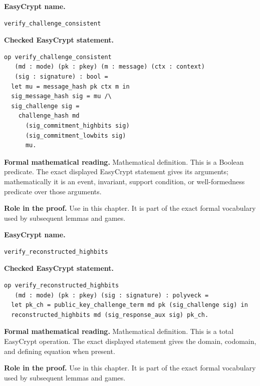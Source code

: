 \begin{formaldefinition}
\noindent\textbf{EasyCrypt name.}
\begin{lstlisting}[language=EasyCrypt,basicstyle=\ttfamily\scriptsize]
verify_challenge_consistent
\end{lstlisting}
\noindent\textbf{Checked EasyCrypt statement.}
\begin{lstlisting}[language=EasyCrypt,basicstyle=\ttfamily\scriptsize]
op verify_challenge_consistent
   (md : mode) (pk : pkey) (m : message) (ctx : context)
   (sig : signature) : bool =
  let mu = message_hash pk ctx m in
  sig_message_hash sig = mu /\
  sig_challenge sig =
    challenge_hash md
      (sig_commitment_highbits sig)
      (sig_commitment_lowbits sig)
      mu.
\end{lstlisting}
\noindent\textbf{Formal mathematical reading.}
Mathematical definition. This is a Boolean predicate.  The exact displayed EasyCrypt statement gives its arguments; mathematically it is an event, invariant, support condition, or well-formedness predicate over those arguments.

\noindent\textbf{Role in the proof.}
Use in this chapter. It is part of the exact formal vocabulary used by subsequent lemmas and games.

\end{formaldefinition}

\begin{formaldefinition}
\noindent\textbf{EasyCrypt name.}
\begin{lstlisting}[language=EasyCrypt,basicstyle=\ttfamily\scriptsize]
verify_reconstructed_highbits
\end{lstlisting}
\noindent\textbf{Checked EasyCrypt statement.}
\begin{lstlisting}[language=EasyCrypt,basicstyle=\ttfamily\scriptsize]
op verify_reconstructed_highbits
   (md : mode) (pk : pkey) (sig : signature) : polyveck =
  let pk_ch = public_key_challenge_term md pk (sig_challenge sig) in
  reconstructed_highbits md (sig_response_aux sig) pk_ch.
\end{lstlisting}
\noindent\textbf{Formal mathematical reading.}
Mathematical definition. This is a total EasyCrypt operation.  The exact displayed statement gives the domain, codomain, and defining equation when present.

\noindent\textbf{Role in the proof.}
Use in this chapter. It is part of the exact formal vocabulary used by subsequent lemmas and games.

\end{formaldefinition}


